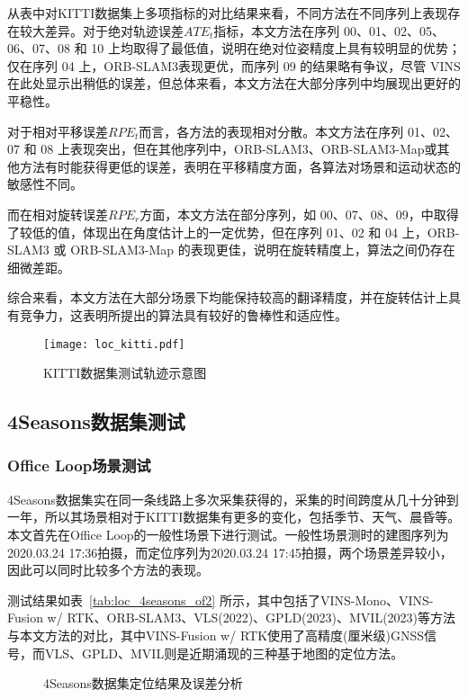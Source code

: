 从表中对KITTI数据集上多项指标的对比结果来看，不同方法在不同序列上表现存在较大差异。对于绝对轨迹误差$ATE_t$指标，本文方法在序列 00、01、02、05、06、07、08 和 10 上均取得了最低值，说明在绝对位姿精度上具有较明显的优势；仅在序列 04 上，ORB-SLAM3表现更优，而序列 09 的结果略有争议，尽管 VINS 在此处显示出稍低的误差，但总体来看，本文方法在大部分序列中均展现出更好的平稳性。

对于相对平移误差$RPE_t$而言，各方法的表现相对分散。本文方法在序列 01、02、07 和 08 上表现突出，但在其他序列中，ORB-SLAM3、ORB-SLAM3-Map或其他方法有时能获得更低的误差，表明在平移精度方面，各算法对场景和运动状态的敏感性不同。

而在相对旋转误差$RPE_r$方面，本文方法在部分序列，如 00、07、08、09，中取得了较低的值，体现出在角度估计上的一定优势，但在序列 01、02 和 04 上，ORB-SLAM3 或 ORB-SLAM3-Map 的表现更佳，说明在旋转精度上，算法之间仍存在细微差距。

综合来看，本文方法在大部分场景下均能保持较高的翻译精度，并在旋转估计上具有竞争力，这表明所提出的算法具有较好的鲁棒性和适应性。

\begin{figure}
  \centering
  \texttt{[image: loc\_kitti.pdf]}
  \caption{KITTI数据集测试轨迹示意图}
  \label{fig:loc_kitti}
\end{figure}

\subsection{4Seasons数据集测试}
\subsubsection{Office Loop场景测试}
4Seasons数据集实在同一条线路上多次采集获得的，采集的时间跨度从几十分钟到一年，所以其场景相对于KITTI数据集有更多的变化，包括季节、天气、晨昏等。本文首先在Office Loop的一般性场景下进行测试。一般性场景测时的建图序列为2020.03.24 17:36拍摄，而定位序列为2020.03.24 17:45拍摄，两个场景差异较小，因此可以同时比较多个方法的表现。

测试结果如表~\ref{tab:loc_4seasons_of2} 所示，其中包括了VINS-Mono、VINS-Fusion w/ RTK、ORB-SLAM3、VLS\cite{yang2022real}(2022)、GPLD\cite{hao2023global}(2023)、MVIL\cite{zhang2023map}(2023)等方法与本文方法的对比，其中VINS-Fusion w/ RTK使用了高精度(厘米级)GNSS信号，而VLS、GPLD、MVIL则是近期涌现的三种基于地图的定位方法。

\begin{figure}
  \centering
  \caption{4Seasons数据集定位结果及误差分析}
  \label{fig:loc_gnssmap}
\end{figure}

